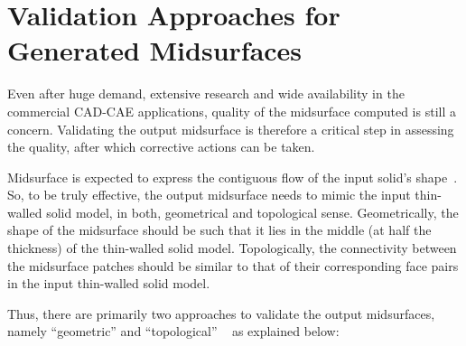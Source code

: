  
\section{Validation Approaches for Generated Midsurfaces} \label{sec:litsurvey:validation}

Even after huge demand, extensive research and wide availability in the commercial CAD-CAE applications, quality of the midsurface computed is still a concern. Validating the output midsurface is therefore a critical step in assessing the quality, after which corrective actions can be taken.

Midsurface is expected to express the contiguous flow of the input solid's shape~\cite{Rezayat1996}. So, to be truly effective, the output midsurface needs to mimic the input thin-walled solid model, in both, geometrical and topological sense. Geometrically, the shape of the midsurface should be such that it lies in the middle (at half the thickness) of the thin-walled solid model. Topologically, the connectivity between the midsurface patches should be similar to that of their corresponding face pairs in the input thin-walled solid model. 


Thus, there are primarily two approaches to validate the output midsurfaces, namely ``geometric'' and ``topological'' ~\cite{Lockett2008} as explained below:

